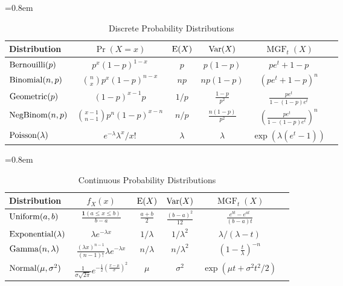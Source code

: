 \documentclass[a4paper, 12pt, fleqn]{article}
\DeclareMathOperator{\MGF}{MGF}
\begin{document}
\begin{table}[!ht]
\centering
\caption{Discrete Probability Distributions}
=0.8em
\abovetopsep=4pt
\begin{tabular}{lccccc}
\toprule Distribution
    & $\Pr(X = x)$
    & $\operatorname*{E}(X)$
    & $\operatorname*{Var}(X)$
    & $\MGF_t(X)$
\\ \midrule $\operatorname{Bernouilli}(p)$
    & $p^x(1-p)^{1-x}$
    & $p$
    & $p(1-p)$
    & $pe^t + 1-p$
\\[\defaultaddspace] $\operatorname{Binomial}(n, p)$
    & $\displaystyle \binom{n}{x}p^x(1-p)^{n-x}$
    & $np$
    & $np(1-p)$
    & $(pe^t + 1-p)^n$
\\[\defaultaddspace] $\operatorname{Geometric}(p)$
    & $(1-p)^{x-1}p$
    & $1/p$
    & $\displaystyle \frac{1-p}{p^2}$
    & $\displaystyle \frac{pe^t}{1-(1-p)e^t}$
\\[\defaultaddspace] $\operatorname{NegBinom}(n, p)$
    & $\displaystyle \binom{x-1}{n-1}p^n(1-p)^{x-n}$
    & $n/p$
    & $\displaystyle \frac{n(1-p)}{p^2}$
    & $\displaystyle \left(\frac{pe^t}{1-(1-p)e^t}\right)^n$
\\[\defaultaddspace] $\operatorname{Poisson}(\lambda)$
    & $e^{-\lambda}\lambda^x/x!$
    & $\lambda$
    & $\lambda$
    & $\displaystyle \exp(\lambda(e^t-1))$
\\ \bottomrule
\end{tabular}
\label{table:disc-distr}
\end{table}

\begin{table}[!ht]
\centering
\caption{Continuous Probability Distributions}
=0.8em
\abovetopsep=4pt
\begin{tabular}{lccccc}
\toprule Distribution
    & $f_X(x)$
    & $\operatorname*{E}(X)$
    & $\operatorname*{Var}(X)$
    & $\MGF_t(X)$
\\ \midrule $\operatorname{Uniform}(a, b)$
    & $\displaystyle \frac{\mathbf{1}(a \le x \le b)}{b-a}$
    & $\displaystyle \frac{a+b}{2}$
    & $\displaystyle \frac{(b-a)^2}{12}$
    & $\displaystyle \frac{e^{bt} - e^{at}}{(b-a)t}$
\\[\defaultaddspace] $\operatorname{Exponential}(\lambda)$
    & $\lambda e^{-\lambda x}$
    & $1/\lambda$
    & $1/\lambda^2$
    & $\lambda/(\lambda - t)$
\\[\defaultaddspace] $\operatorname{Gamma}(n, \lambda)$
    & $\displaystyle \frac{(\lambda x)^{n-1}}{(n-1)!} \lambda e^{-\lambda x}$
    & $n/\lambda$
    & $n/\lambda^2$
    & $\displaystyle \left(1-\frac{t}{\lambda}\right)^{-n}$
\\[\defaultaddspace] $\operatorname{Normal}(\mu, \sigma^2)$
    & $\displaystyle \frac{1}{\sigma\sqrt{2\pi}}e^{-\frac{1}{2}\left(\frac{x-\mu}{\sigma}\right)^2}$
    & $\mu$
    & $\sigma^2$
    & $\exp(\mu t + \sigma^2t^2/2)$
\\ \bottomrule
\end{tabular}
\label{table:cont-distr}
\end{table}
\end{document}
